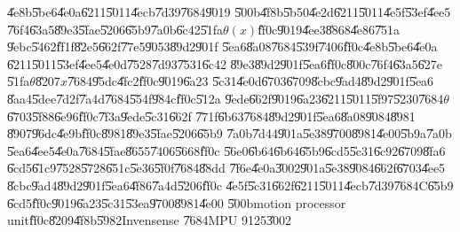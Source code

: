 \bigskip

\U{4e8b}\U{5be6}\U{4e0a}\U{6211}\U{5011}\U{4ecb}\U{7d39}\U{7684}\U{9019}%
\U{500b}\U{4f8b}\U{5b50}\U{4e2d}\U{6211}\U{5011}\U{4e5f}\U{53ef}\U{4ee5}%
\U{76f4}\U{63a5}\U{89e3}\U{5fae}\U{5206}\U{65b9}\U{7a0b}\U{6c42}\U{51fa}$%
\theta \left( x\right) $\U{ff0c}\U{9019}\U{4ee3}\U{8868}\U{4e86}\U{751a}%
\U{9ebc}\U{5462}\U{ff1f}\U{82e5}\U{662f}\U{77e5}\U{9053}\U{89d2}\U{901f}%
\U{5ea6}\U{8a08}\U{7684}\U{539f}\U{7406}\U{ff0c}\U{4e8b}\U{5be6}\U{4e0a}%
\U{6211}\U{5011}\U{53ef}\U{4ee5}\U{4e0d}\U{7528}\U{7d93}\U{7531}\U{6c42}%
\U{89e3}\U{89d2}\U{901f}\U{5ea6}\U{ff0c}\U{800c}\U{76f4}\U{63a5}\U{627e}%
\U{51fa}$\theta $\U{8207}$x$\U{7684}\U{95dc}\U{4fc2}\U{ff0c}\U{9019}\U{6a23}%
\U{5c31}\U{4e0d}\U{6703}\U{6709}\U{8cbc}\U{9ad4}\U{89d2}\U{901f}\U{5ea6}%
\U{8aa4}\U{5dee}\U{7d2f}\U{7a4d}\U{7684}\U{554f}\U{984c}\U{ff0c}\U{512a}%
\U{9ede}\U{662f}\U{9019}\U{6a23}\U{6211}\U{5011}\U{5f97}\U{5230}\U{7684}$%
\theta $\U{6703}\U{5f88}\U{6e96}\U{ff0c}\U{7f3a}\U{9ede}\U{5c31}\U{662f}%
\U{771f}\U{6b63}\U{7684}\U{89d2}\U{901f}\U{5ea6}\U{8a08}\U{9084}\U{8981}%
\U{8907}\U{96dc}\U{4e9b}\U{ff0c}\U{8981}\U{89e3}\U{5fae}\U{5206}\U{65b9}%
\U{7a0b}\U{7d44}\U{901a}\U{5e38}\U{9700}\U{8981}\U{4e00}\U{5b9a}\U{7a0b}%
\U{5ea6}\U{4ee5}\U{4e0a}\U{7684}\U{5fae}\U{8655}\U{7406}\U{5668}\U{ff0c}%
\U{56e0}\U{6b64}\U{6b64}\U{65b9}\U{6cd5}\U{5c31}\U{6c92}\U{6709}\U{8fa6}%
\U{6cd5}\U{61c9}\U{7528}\U{5728}\U{651c}\U{5e36}\U{5f0f}\U{7684}\U{88dd}%
\U{7f6e}\U{4e0a}\U{3002}\U{901a}\U{5e38}\U{9084}\U{662f}\U{6703}\U{4ee5}%
\U{8cbc}\U{9ad4}\U{89d2}\U{901f}\U{5ea6}\U{4f86}\U{7a4d}\U{5206}\U{ff0c}%
\U{4e5f}\U{5c31}\U{662f}\U{6211}\U{5011}\U{4ecb}\U{7d39}\U{7684}C\U{65b9}%
\U{6cd5}\U{ff0c}\U{9019}\U{6a23}\U{5c31}\U{53ea}\U{9700}\U{8981}\U{4e00}%
\U{500b}motion processor unit\U{ff0c}\U{8209}\U{4f8b}\U{5982}Invensense%
\U{7684}MPU 9125\U{3002}

\bigskip

